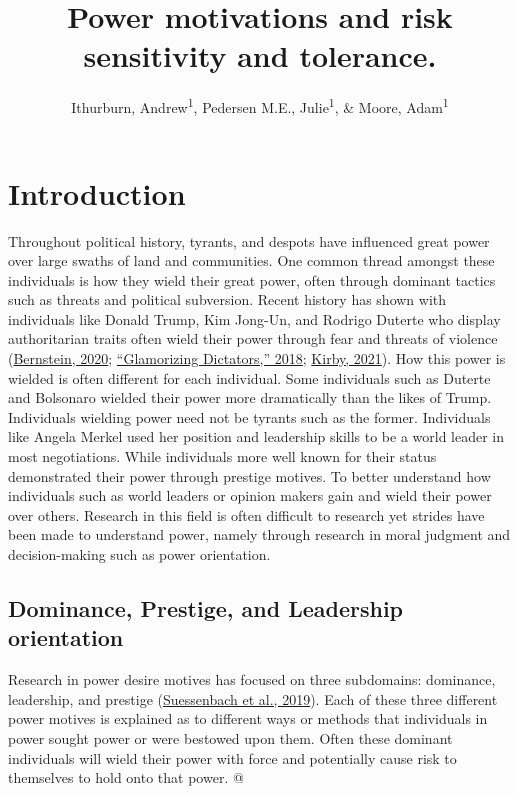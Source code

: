 \documentclass[
  donotrepeattitle,doc, 12pt, a4paper,floatsintext]{apa7}
\title{Power motivations and risk sensitivity and tolerance.}
\author{Ithurburn, Andrew\textsuperscript{1}, Pedersen M.E., Julie\textsuperscript{1}, \& Moore, Adam\textsuperscript{1}}
\date{}
\affiliation{\vspace{0.5cm}\textsuperscript{1} The University of Edinburgh}
\begin{document}
\maketitle
\hypertarget{introduction}{%
\section{Introduction}\label{introduction}}
Throughout political history, tyrants, and despots have influenced great power over large swaths of land and communities. One common thread amongst these individuals is how they wield their great power, often through dominant tactics such as threats and political subversion. Recent history has shown with individuals like Donald Trump, Kim Jong-Un, and Rodrigo Duterte who display authoritarian traits often wield their power through fear and threats of violence (\protect\hyperlink{ref-bernstein2020}{Bernstein, 2020}; \protect\hyperlink{ref-2018}{{``Glamorizing Dictators,''} 2018}; \protect\hyperlink{ref-kirby2021}{Kirby, 2021}). How this power is wielded is often different for each individual. Some individuals such as Duterte and Bolsonaro wielded their power more dramatically than the likes of Trump. Individuals wielding power need not be tyrants such as the former. Individuals like Angela Merkel used her position and leadership skills to be a world leader in most negotiations. While individuals more well known for their status demonstrated their power through prestige motives. To better understand how individuals such as world leaders or opinion makers gain and wield their power over others. Research in this field is often difficult to research yet strides have been made to understand power, namely through research in moral judgment and decision-making such as power orientation.
\hypertarget{dominance-prestige-and-leadership-orientation}{%
\subsection{Dominance, Prestige, and Leadership orientation}\label{dominance-prestige-and-leadership-orientation}}
Research in power desire motives has focused on three subdomains: dominance, leadership, and prestige (\protect\hyperlink{ref-suessenbach2019}{Suessenbach et al., 2019}). Each of these three different power motives is explained as to different ways or methods that individuals in power sought power or were bestowed upon them. Often these dominant individuals will wield their power with force and potentially cause risk to themselves to hold onto that power. @
\end{document}
